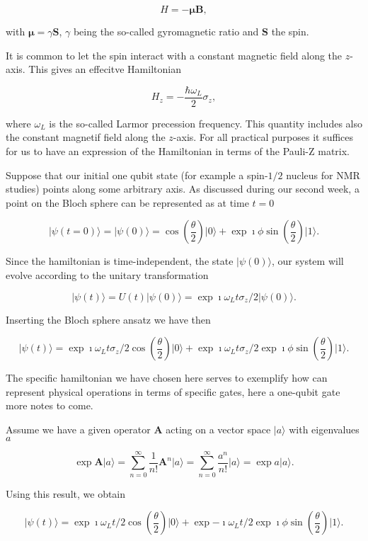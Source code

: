 \[
H = -\bm{\mu}\bm{B},
\]

with $\bm{\mu}=\gamma\bm{S}$, $\gamma$ being the so-called gyromagnetic ratio and $\bm{S}$ the spin.



It is common to let the spin interact with a constant magnetic field
along the $z$-axis. This gives an effecitve Hamiltonian


\[
H_z = -\frac{\hbar\omega_L}{2}\sigma_z,
\]


where $\omega_L$ is the so-called Larmor precession frequency. This
quantity includes also the constant magnetif field along the
$z$-axis. For all practical purposes it suffices for us to have an
expression of the Hamiltonian in terms of the Pauli-Z matrix.


Suppose that our initial one qubit state (for example a spin-$1/2$
nucleus for NMR studies) points along some arbitrary axis. As
discussed during our second week, a point on the Bloch sphere can be
represented as at time $t=0$

\[
\vert \psi(t=0) \rangle = \vert \psi(0) \rangle=\cos{(\frac{\theta}{2})}\vert 0\rangle +\exp{\imath\phi}\sin{(\frac{\theta}{2})}\vert 1\rangle.
\]



Since the hamiltonian is time-independent, the state $\vert \psi(0)
\rangle$, our system will evolve according to the unitary transformation 

\[
\vert \psi(t) \rangle = U(t)\vert \psi(0) \rangle=\exp{\imath\omega_L t\sigma_z/2}\vert \psi(0) \rangle.
\]

Inserting the Bloch sphere ansatz we have then

\[
\vert \psi(t) \rangle=\exp{\imath\omega_L t\sigma_z/2}\cos{(\frac{\theta}{2})}\vert 0\rangle +\exp{\imath\omega_L t\sigma_z/2}\exp{\imath\phi}\sin{(\frac{\theta}{2})}\vert 1\rangle.
\]


The specific hamiltonian we have chosen here serves to exemplify how can represent physical operations in terms of specific gates, here a one-qubit gate more notes to come.

Assume we have a given operator $\bm{A}$ acting on a  vector space $\vert a\rangle$ with eigenvalues $a$ 

\[
\exp{\bm{A}}\vert a\rangle=\sum_{n=0}^{\infty} \frac{1}{n!}\bm{A}^n\vert a\rangle=\sum_{n=0}^{\infty} \frac{a^n}{n!}\vert a\rangle=\exp{a}\vert a\rangle.
\]


Using this result, we obtain

\[
\vert \psi(t) \rangle=\exp{\imath\omega_L t/2}\cos{(\frac{\theta}{2})}\vert 0\rangle +\exp{-\imath\omega_L t/2}\exp{\imath\phi}\sin{(\frac{\theta}{2})}\vert 1\rangle.
\]


